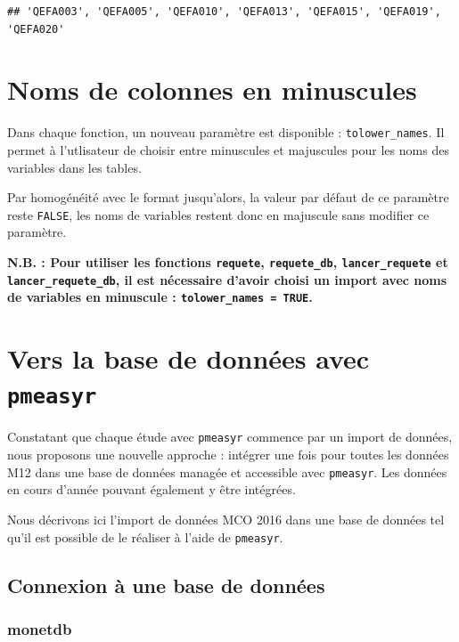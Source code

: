 \documentclass[]{book}
\theoremstyle{definition}
\theoremstyle{definition}
\theoremstyle{definition}
\theoremstyle{remark}
\begin{document}
\begin{verbatim}
## 'QEFA003', 'QEFA005', 'QEFA010', 'QEFA013', 'QEFA015', 'QEFA019', 'QEFA020'
\end{verbatim}

\chapter{Noms de colonnes en
minuscules}\label{noms-de-colonnes-en-minuscules}

Dans chaque fonction, un nouveau paramètre est disponible :
\texttt{tolower\_names}. Il permet à l'utlisateur de choisir entre
minuscules et majuscules pour les noms des variables dans les tables.

Par homogénéité avec le format jusqu'alors, la valeur par défaut de ce
paramètre reste \texttt{FALSE}, les noms de variables restent donc en
majuscule sans modifier ce paramètre.

\textbf{N.B. : Pour utiliser les fonctions \texttt{requete},
\texttt{requete\_db}, \texttt{lancer\_requete} et
\texttt{lancer\_requete\_db}, il est nécessaire d'avoir choisi un import
avec noms de variables en minuscule : \texttt{tolower\_names\ =\ TRUE}.}

\chapter{\texorpdfstring{Vers la base de données avec
\texttt{pmeasyr}}{Vers la base de données avec pmeasyr}}\label{vers-la-base-de-donnees-avec-pmeasyr}

Constatant que chaque étude avec \texttt{pmeasyr} commence par un import
de données, nous proposons une nouvelle approche : intégrer une fois
pour toutes les données M12 dans une base de données managée et
accessible avec \texttt{pmeasyr}. Les données en cours d'année pouvant
également y être intégrées.

Nous décrivons ici l'import de données MCO 2016 dans une base de données
tel qu'il est possible de le réaliser à l'aide de \texttt{pmeasyr}.

\section{Connexion à une base de
données}\label{connexion-a-une-base-de-donnees}

\subsection{monetdb}\label{monetdb}
\end{document}
